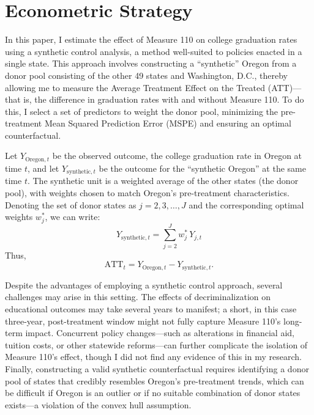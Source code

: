 \documentclass[12pt]{article}
\begin{document}
\section{Econometric Strategy}

In this paper, I estimate the effect of Measure 110 on college graduation
rates using a synthetic control analysis, a method well-suited to policies
enacted in a single state. This approach involves constructing a
``synthetic'' Oregon from a donor pool consisting of the other 49 states
and Washington, D.C., thereby allowing me to measure the Average Treatment
Effect on the Treated (ATT)---that is, the difference in graduation rates
with and without Measure 110. To do this, I select a set of predictors to
weight the donor pool, minimizing the pre-treatment Mean Squared Prediction
Error (MSPE) and ensuring an optimal counterfactual.

Let $Y_{\text{Oregon},t}$ be the observed outcome, the college graduation
rate in Oregon at time $t$, and let $Y_{\text{synthetic},t}$ be the outcome
for the ``synthetic Oregon'' at the same time $t$. The synthetic unit is a
weighted average of the other states (the donor pool), with weights chosen
to match Oregon's pre-treatment characteristics. Denoting the set of donor
states as $j = 2, 3, \ldots, J$ and the corresponding optimal weights
$w_j^*$, we can write:
\begin{equation}
Y_{\text{synthetic},t} = \sum_{j=2}^{J} w_j^* \, Y_{j,t}
\end{equation}
Thus,
\begin{equation}
\text{ATT}_t = Y_{\text{Oregon},t} - Y_{\text{synthetic},t}.
\end{equation}

Despite the advantages of employing a synthetic control approach, several
challenges may arise in this setting. The effects of decriminalization on
educational outcomes may take several years to manifest; a short, in this
case three-year, post-treatment window might not fully capture Measure
110's long-term impact. Concurrent policy changes---such as alterations in
financial aid, tuition costs, or other statewide reforms---can further
complicate the isolation of Measure 110's effect, though I did not find any
evidence of this in my research. Finally, constructing a valid synthetic
counterfactual requires identifying a donor pool of states that credibly
resembles Oregon's pre-treatment trends, which can be difficult if Oregon
is an outlier or if no suitable combination of donor states exists---a
violation of the convex hull assumption.
\end{document}
